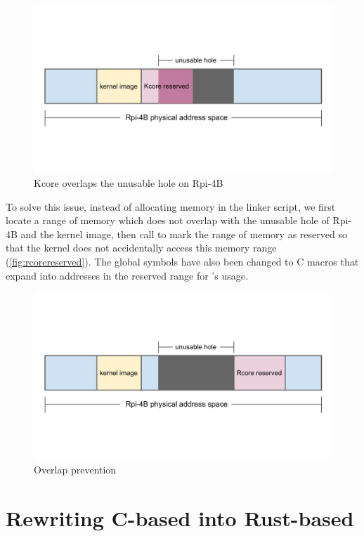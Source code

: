 \begin{figure}[hbtp]
    \includegraphics[scale=0.60]{figures/overlap.pdf}
    \caption{Kcore overlaps the unusable hole on Rpi-4B}
    \label{fig:overlap}
\end{figure}

To solve this issue, instead of allocating memory in the linker script,
we first locate a range of memory which does not overlap with the unusable hole
of Rpi-4B and the kernel image, then call  to 
mark the range of memory as reserved so that the kernel does not accidentally
access this memory range (\autoref{fig:rcorereserved}).
The global symbols have also been changed to C macros that expand into
addresses in the reserved range for \rustsec{}'s \rustcore{} usage.

\begin{figure}[H]
    \includegraphics[scale=0.60]{figures/rcore_reserved.pdf}
    \caption{Overlap prevention}
    \label{fig:rcorereserved}
\end{figure}

\section{Rewriting C-based \secore{} into Rust-based \rustcore{}}

